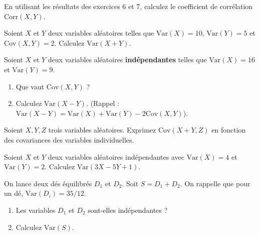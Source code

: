 \begin{exercicebox}
En utilisant les résultats des exercices 6 et 7, calculez le coefficient de corrélation $\text{Corr}(X,Y)$.
\end{exercicebox}


\begin{exercicebox}
Soient $X$ et $Y$ deux variables aléatoires telles que $\text{Var}(X) = 10$, $\text{Var}(Y) = 5$ et $\text{Cov}(X,Y) = 2$.
Calculez $\text{Var}(X+Y)$.
\end{exercicebox}

\begin{exercicebox}
Soient $X$ et $Y$ deux variables aléatoires \textbf{indépendantes} telles que $\text{Var}(X) = 16$ et $\text{Var}(Y) = 9$.
\begin{enumerate}
    \item Que vaut $\text{Cov}(X,Y)$ ?
    \item Calculez $\text{Var}(X-Y)$. (Rappel : $\text{Var}(X-Y) = \text{Var}(X) + \text{Var}(Y) - 2\text{Cov}(X,Y)$).
\end{enumerate}
\end{exercicebox}

\begin{exercicebox}
Soient $X, Y, Z$ trois variables aléatoires. Exprimez $\text{Cov}(X+Y, Z)$ en fonction des covariances des variables individuelles.
\end{exercicebox}

\begin{exercicebox}
Soient $X$ et $Y$ deux variables aléatoires indépendantes avec $\text{Var}(X) = 4$ et $\text{Var}(Y) = 2$.
Calculez $\text{Var}(3X - 5Y + 1)$.
\end{exercicebox}

\begin{exercicebox}
On lance deux dés équilibrés $D_1$ et $D_2$. Soit $S = D_1 + D_2$.
On rappelle que pour un dé, $\text{Var}(D_i) = 35/12$.
\begin{enumerate}
    \item Les variables $D_1$ et $D_2$ sont-elles indépendantes ?
    \item Calculez $\text{Var}(S)$.
\end{enumerate}
\end{exercicebox}


